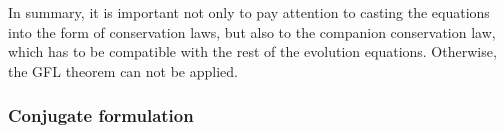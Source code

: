 \documentclass[twoside]{article}
\newcommand{\pd}{\partial}
\begin{document}

In summary, it is important not only to pay attention to casting the 
equations into the form of conservation laws, but also to the companion
conservation law, which has to be compatible with the rest of the evolution equations. 
Otherwise, the GFL theorem can not be applied.


\subsubsection{Conjugate formulation}\label{sec.conj.euler}
\end{document}
